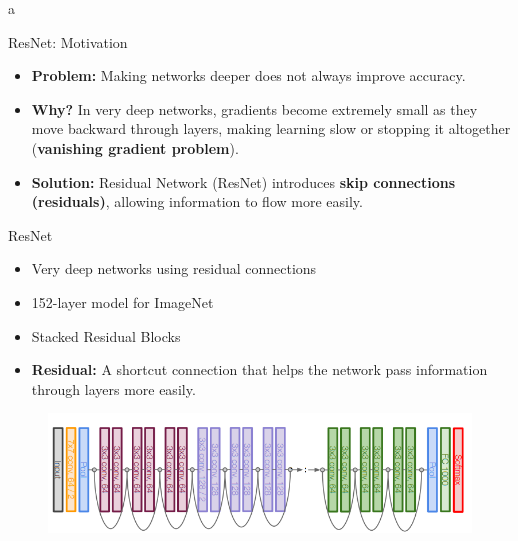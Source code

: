 a\documentclass[10pt]{beamer}
\theoremstyle{remark}
\theoremstyle{definition}
\begin{document}
\begin{frame}{ResNet: Motivation}
    \begin{itemize}
        \item \textbf{Problem:} Making networks deeper does not always improve accuracy.
        \item \textbf{Why?} In very deep networks, gradients become extremely small as they move backward through layers, making learning slow or stopping it altogether (\textbf{vanishing gradient problem}).
        \item \textbf{Solution:} Residual Network (ResNet) introduces \textbf{skip connections (residuals)}, allowing information to flow more easily.

    \end{itemize}
\end{frame}



\begin{frame}{ResNet}
\begin{itemize}
    \item Very deep networks using residual connections
    \item 152-layer model for ImageNet
    \item Stacked Residual Blocks
    \item \textbf{Residual:} A shortcut connection that helps the network pass information through layers more easily.


\end{itemize}

\begin{figure}
\centering
\includegraphics[width=1.0\textwidth,height=0.6\textheight,keepaspectratio]{./images/resnet_1.png}
\end{figure}
    
\end{frame}
\end{document}
